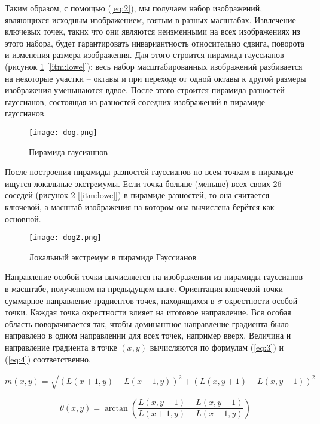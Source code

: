 Таким образом, с помощью (\ref{eq:2}), мы получаем набор изображений, являющихся исходным изображением, взятым в разных масштабах. Извлечение ключевых точек, таких что они являются неизменными на всех изображениях из этого набора, будет гарантировать инвариантность относительно сдвига, поворота и изменения размера изображения. Для этого строится пирамида гауссианов (рисунок \ref{fig:dog1} \hyperref[itm:lowe]{[\ref{itm:lowe}]}): весь набор масштабированных изображений разбивается на некоторые участки -- октавы и при переходе от одной октавы к другой размеры изображения уменьшаются вдвое. После этого строится пирамида разностей гауссианов, состоящая из разностей соседних изображений в пирамиде гауссианов.

\begin{figure}[h]
    \centering
    \texttt{[image: dog.png]}
    \caption{Пирамида гаусианнов}
    \label{fig:dog1}
\end{figure}

После построения пирамиды разностей гауссианов по всем точкам в пирамиде ищутся локальные экстремумы. Если точка больше (меньше) всех своих 26 соседей (рисунок \ref{fig:dog2} \hyperref[itm:lowe]{[\ref{itm:lowe}]}) в пирамиде разностей, то она считается ключевой, а масштаб изображения на котором она вычислена берётся как основной.

\begin{figure}[h]
    \centering
    \texttt{[image: dog2.png]}
    \caption{Локальный экстремум в пирамиде Гауссианов}
    \label{fig:dog2}
\end{figure}

Направление особой точки вычисляется на изображении из пирамиды гауссианов в масштабе, полученном на предыдущем шаге. Ориентация ключевой точки -- суммарное направление градиентов точек, находящихся в  $\sigma$-окрестности особой точки. Каждая точка окрестности влияет на итоговое направление. Вся особая область поворачивается так, чтобы доминантное направление градиента было направлено в одном направлении для всех точек, например вверх. Величина и направление градиента в точке $(x,y)$ вычисляются по формулам (\ref{eq:3}) и (\ref{eq:4}) соответственно.

\begin{equation} \label{eq:3}
    m(x,y)=\sqrt{(L(x+1,y) - L(x-1,y))^2 + (L(x,y+1) - L(x,y-1))^2}
\end{equation}

\begin{equation} \label{eq:4}
    \theta(x,y)=\arctan{\left(\frac{L(x,y+1) - L(x,y-1)}{L(x+1,y) - L(x-1,y)}\right)}
\end{equation}

